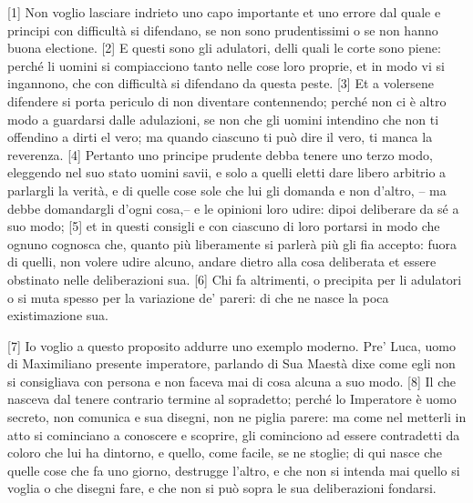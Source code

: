 {[}1{]} Non voglio lasciare indrieto uno capo importante et uno errore
dal quale e principi con difficultà si difendano, se non sono
prudentissimi o se non hanno buona electione. {[}2{]} E questi sono gli
adulatori, delli quali le corte sono piene: perché li uomini si
compiacciono tanto nelle cose loro proprie, et in modo vi si ingannono,
che con difficultà si difendano da questa peste. {[}3{]} Et a volersene
difendere si porta periculo di non diventare contennendo; perché non ci
è altro modo a guardarsi dalle adulazioni, se non che gli uomini
intendino che non ti offendino a dirti el vero; ma quando ciascuno ti
può dire il vero, ti manca la reverenza. {[}4{]} Pertanto uno principe
prudente debba tenere uno terzo modo, eleggendo nel suo stato uomini
savii, e solo a quelli eletti dare libero arbitrio a parlargli la
verità, e di quelle cose sole che lui gli domanda e non d'altro, -- ma
debbe domandargli d'ogni cosa,-- e le opinioni loro udire: dipoi
deliberare da sé a suo modo; {[}5{]} et in questi consigli e con
ciascuno di loro portarsi in modo che ognuno cognosca che, quanto più
liberamente si parlerà più gli fia accepto: fuora di quelli, non volere
udire alcuno, andare dietro alla cosa deliberata et essere obstinato
nelle deliberazioni sua. {[}6{]} Chi fa altrimenti, o precipita per li
adulatori o si muta spesso per la variazione de' pareri: di che ne nasce
la poca existimazione sua.

{[}7{]} Io voglio a questo proposito addurre uno exemplo moderno. Pre'
Luca, uomo di Maximiliano presente imperatore, parlando di Sua Maestà
dixe come egli non si consigliava con persona e non faceva mai di cosa
alcuna a suo modo. {[}8{]} Il che nasceva dal tenere contrario termine
al sopradetto; perché lo Imperatore è uomo secreto, non comunica e sua
disegni, non ne piglia parere: ma come nel metterli in atto si
cominciano a conoscere e scoprire, gli cominciono ad essere contradetti
da coloro che lui ha dintorno, e quello, come facile, se ne stoglie; di
qui nasce che quelle cose che fa uno giorno, destrugge l'altro, e che
non si intenda mai quello si voglia o che disegni fare, e che non si può
sopra le sua deliberazioni fondarsi.

